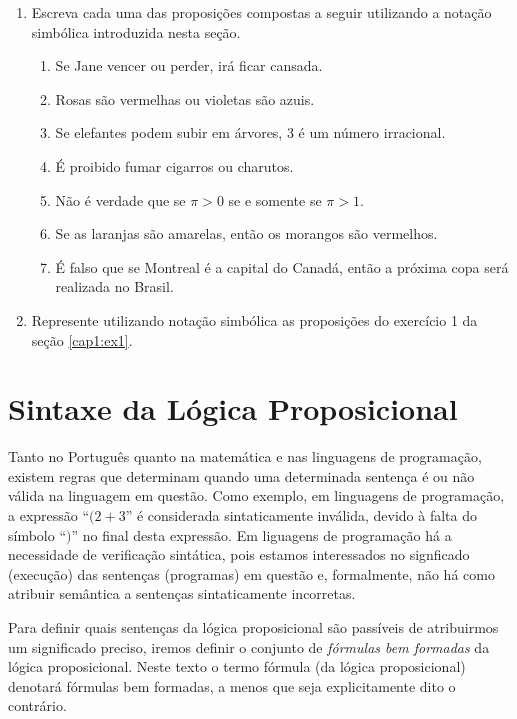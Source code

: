 \begin{enumerate}
  \item Escreva cada uma das proposi\c{c}\~oes compostas a seguir utilizando a nota\c{c}\~ao simb\'olica introduzida nesta se\c{c}\~ao.
  \begin{enumerate}
    \item Se Jane vencer ou perder, ir\'a ficar cansada.
    \item Rosas s\~ao vermelhas ou violetas s\~ao azuis.
    \item Se elefantes podem subir em \'arvores, 3 \'e um n\'umero irracional.
    \item \'E proibido fumar cigarros ou charutos.
    \item N\~ao \'e verdade que se $\pi > 0$ se e somente se $\pi > 1$.
    \item Se as laranjas s\~ao amarelas, ent\~ao os morangos s\~ao vermelhos.
    \item \'E falso que se Montreal \'e a capital do Canad\'a, ent\~ao a pr\'oxima copa ser\'a realizada no Brasil.
  \end{enumerate}
  \item Represente utilizando nota\c{c}\~ao simb\'olica as proposi\c{c}\~oes do exerc\'icio 1 da se\c{c}\~ao \ref{cap1:ex1}.
\end{enumerate}

\section{Sintaxe da L\'ogica Proposicional}

Tanto no Portugu\^es quanto na matem\'atica e nas linguagens de programa\c{c}\~ao, existem regras que determinam quando uma determinada
senten\c{c}a \'e ou n\~ao v\'alida na linguagem em quest\~ao. Como exemplo, em linguagens de programa\c{c}\~ao, a express\~ao ``$(2 + 3$'' \'e
considerada sintaticamente inv\'alida, devido à falta do s\'imbolo ``$)$'' no final desta express\~ao. Em liguagens de programa\c{c}\~ao h\'a a necessidade
de verifica\c{c}\~ao sint\'atica, pois estamos interessados no signficado (execu\c{c}\~ao) das senten\c{c}as (programas) em quest\~ao e,
formalmente, n\~ao h\'a como atribuir sem\^antica a senten\c{c}as sintaticamente incorretas.

Para definir quais senten\c{c}as da l\'ogica proposicional s\~ao pass\'iveis de atribuirmos um significado preciso, iremos definir o conjunto
de \textit{f\'ormulas bem formadas} da l\'ogica proposicional. Neste texto o termo f\'ormula (da l\'ogica proposicional) denotar\'a f\'ormulas
bem formadas, a menos que seja explicitamente dito o contr\'ario.

